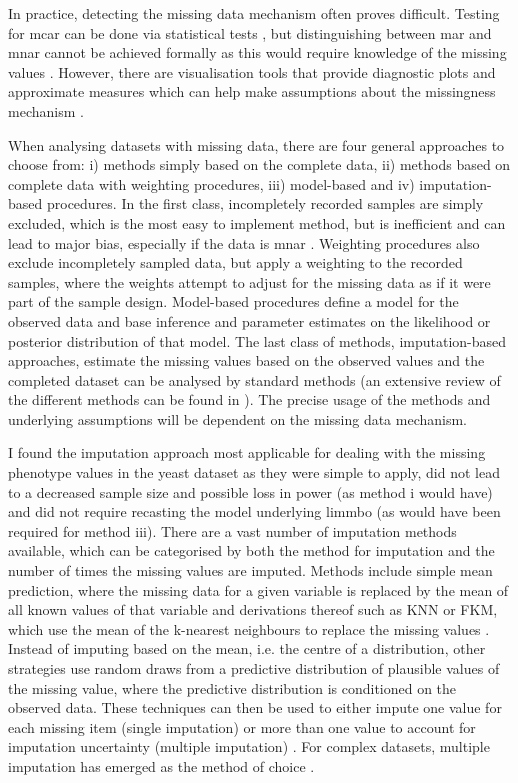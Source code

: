 In practice, detecting the missing data mechanism often proves difficult. Testing for \gls{mcar} can be done via statistical tests \citep{Little1988}, but distinguishing between \gls{mar} and \gls{mnar} cannot be achieved formally as this would require knowledge of the missing values \citep{Little2002,vanBuuren2011}. However, there are visualisation tools that provide diagnostic plots and approximate measures which can help make assumptions about the missingness mechanism \citep{Templ2012,Garson2015}. 

When analysing datasets with missing data, there are four general approaches to choose from:  i) methods simply based on the complete data, ii) methods based on complete data with weighting procedures, iii) model-based and iv) imputation-based procedures. In the first class, incompletely recorded samples are simply excluded, which is the most easy to implement method, but is inefficient and can lead to major bias, especially if the data is \gls{mnar} \citep{Little2002}. Weighting procedures also exclude incompletely sampled data, but apply a weighting to the recorded samples, where the weights attempt to adjust for the missing data as if it were part of the sample design. Model-based procedures define a model for the observed data and base inference and parameter estimates on the likelihood or posterior distribution of that model. The last class of methods, imputation-based approaches, estimate the missing values based on the observed values and the completed dataset can be analysed by standard methods (an extensive review of the different methods can be found in \citep{Little2002}). The precise usage of the methods and underlying assumptions will be dependent on the missing data mechanism. 

I found the imputation approach most applicable for dealing with the missing phenotype values in the yeast dataset as they were simple to apply, did not lead to a decreased sample size and possible loss in power (as method i would have) and did not require recasting the model underlying \gls{limmbo} (as would have been required for method iii). There are a vast number of imputation methods available, which can be categorised by both the method for imputation and the number of times the missing values are imputed. Methods include simple mean prediction, where the missing data for a given variable is replaced by the mean of all known values of that variable and derivations thereof such as KNN or FKM, which use the mean of the k-nearest neighbours to replace the missing values \citep{Troyanskaya2001,Li2004}. Instead of imputing based on the mean, i.e. the centre of a distribution, other strategies use random draws from a predictive distribution of plausible values of the missing value, where the predictive distribution is conditioned on the observed data. These techniques can then be used to either impute one value for each missing item (single imputation) or more than one value to account for imputation uncertainty (multiple imputation) \citep{Little2002}. For complex datasets, multiple imputation has emerged as the method of choice \citep{Rubin1987,Schafer1997}. 

